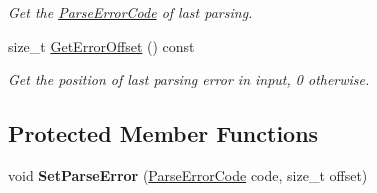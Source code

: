\begin{DoxyCompactItemize}
\begin{DoxyCompactList}\small\item\em Get the \hyperlink{group___r_a_p_i_d_j_s_o_n___e_r_r_o_r_s_ga8d4b32dfc45840bca189ade2bbcb6ba7}{Parse\+Error\+Code} of last parsing. \end{DoxyCompactList}\item 
size\+\_\+t \hyperlink{class_generic_reader_a77399ac40cca1fb113a2d507f476b4e7}{Get\+Error\+Offset} () const \hypertarget{class_generic_reader_a77399ac40cca1fb113a2d507f476b4e7}{}\label{class_generic_reader_a77399ac40cca1fb113a2d507f476b4e7}

\begin{DoxyCompactList}\small\item\em Get the position of last parsing error in input, 0 otherwise. \end{DoxyCompactList}\end{DoxyCompactItemize}
\subsection*{Protected Member Functions}
\begin{DoxyCompactItemize}
\item 
void {\bfseries Set\+Parse\+Error} (\hyperlink{group___r_a_p_i_d_j_s_o_n___e_r_r_o_r_s_ga8d4b32dfc45840bca189ade2bbcb6ba7}{Parse\+Error\+Code} code, size\+\_\+t offset)\hypertarget{class_generic_reader_ae50079444295bf109730c3b708a818a6}{}\label{class_generic_reader_ae50079444295bf109730c3b708a818a6}

\end{DoxyCompactItemize}
